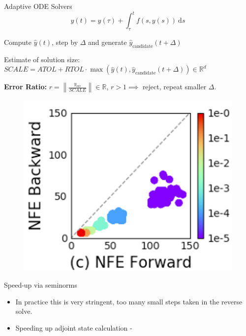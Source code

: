 \documentclass[usenames,dvipsnames]{beamer}
\theoremstyle{definition}
\let\oldcite=\cite
\renewcommand{\cite}[2][]{\textcolor{green}{\oldcite[#1]{#2}}}
\begin{document}
\begin{frame}{Adaptive ODE Solvers}
    $$y(t)=y(\tau)+\int_\tau^tf(s,y(s))\mathrm{~d}s$$

    Compute $\widehat{y}(t)$, step by $\Delta$ and generate $\widehat{y}_{\textrm{candidate}}(t + \Delta)$

    Estimate of solution size: $SCALE=ATOL+RTOL\cdot\max(\widehat{y}(t),\widehat{y}_\text{candidate}(t+\Delta))\in\mathbb{R}^d$

    \textbf{Error Ratio:} $r=\left\|\frac{y_{\mathrm{err}}}{SCALE}\right\|\in\mathbb{R}$, $r > 1 \implies$ reject, repeat smaller $\Delta$.

    \begin{figure}
        \centering
        \includegraphics[width=0.32\linewidth]{NFE_Forward_vs_Backward.png}
        \label{fig:nfe}
    \end{figure}



\end{frame}

\begin{frame}{Speed-up via seminorms}
    \begin{itemize}
        \item In practice this is very stringent, too many small steps taken in the reverse solve.
        
        \item Speeding up adjoint state calculation - \cite{kidger_hey_2021}
         
    \end{itemize}
\end{frame}
\end{document}
